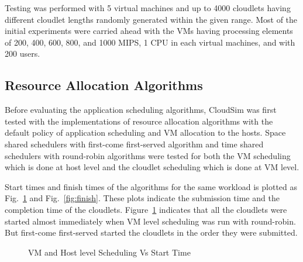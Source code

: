 \documentclass{llncs}
\begin{document}
Testing was performed with 5 virtual machines and up to 4000 cloudlets having different cloudlet lengths randomly generated within the given range. Most of the initial experiments were carried ahead with the VMs having processing elements of 200, 400, 600, 800, and 1000 MIPS, 1 CPU in each virtual machines, and with 200 users.
\subsection{Resource Allocation Algorithms}
Before evaluating the application scheduling algorithms, CloudSim was first tested with the implementations of resource allocation algorithms with the default policy of application scheduling and VM allocation to the hosts. Space shared schedulers with first-come first-served algorithm and time shared schedulers with round-robin algorithms were tested for both the VM scheduling which is done at host level and the cloudlet scheduling which is done at VM level.

Start times and finish times of the algorithms for the same workload is plotted as Fig.~\ref{fig:start} and Fig.~\ref{fig:finish}. These plots indicate the submission time and the completion time of the cloudlets. Figure~\ref{fig:start} indicates that all the cloudlets were started almost immediately when VM level scheduling was run with round-robin. But first-come first-served started the cloudlets in the order they were submitted.
\begin{figure}[ht]
 \caption{VM and Host level Scheduling Vs Start Time}
 \label{fig:start}
\end{figure}
\end{document}
